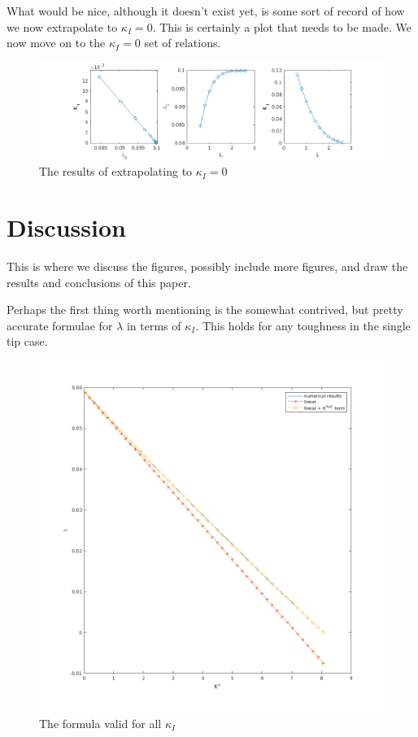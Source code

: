 \documentclass{jfm}
\begin{document}
What would be nice, although it doesn't exist yet, is some sort of record of
how we now extrapolate to $\kappa_I=0$. This is certainly a plot that needs to 
be made.
We now move on to the $\kappa_I=0$ set of relations.
\begin{figure}
 \centerline{
\includegraphics[scale=0.5]{./../../Graphs/KI-0.png}}
  \caption{The results of extrapolating to $\kappa_I = 0$}
\end{figure}
\section{Discussion}
This is where we discuss the figures, possibly include more figures, and draw
the results and conclusions of this paper.

Perhaps the first thing worth mentioning is the somewhat contrived, but pretty
accurate formulae for $\lambda$ in terms of $\kappa_I$. This holds for any 
toughness in the single tip case.
\begin{figure}
 \centerline{
\includegraphics[scale=0.3]{./../../Graphs/overall-fit.png}}
  \caption{The formula valid for all $\kappa_I$}
\end{figure}
\end{document}
